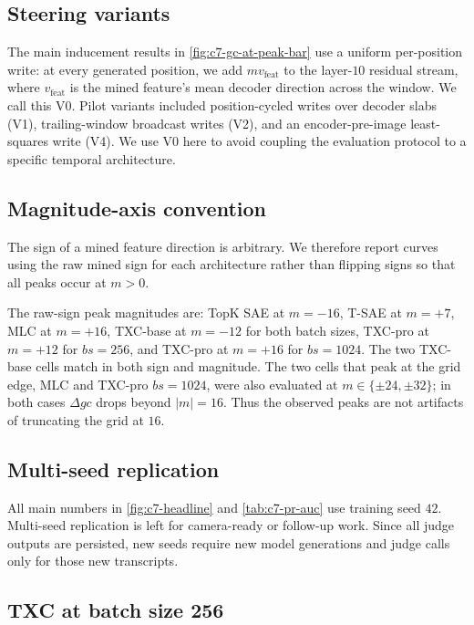 \subsection{Steering variants}
\label{app:c7-steering-variants}

The main inducement results in \cref{fig:c7-gc-at-peak-bar} use a uniform per-position write: at every generated position, we add $m v_{\text{feat}}$ to the layer-$10$ residual stream, where $v_{\text{feat}}$ is the mined feature's mean decoder direction across the window. We call this V0. Pilot variants included position-cycled writes over decoder slabs (V1), trailing-window broadcast writes (V2), and an encoder-pre-image least-squares write (V4). We use V0 here to avoid coupling the evaluation protocol to a specific temporal architecture.

\subsection{Magnitude-axis convention}
\label{app:c7-magnitude-axis}

The sign of a mined feature direction is arbitrary. We therefore report curves using the raw mined sign for each architecture rather than flipping signs so that all peaks occur at $m>0$.

The raw-sign peak magnitudes are: TopK SAE at $m=-16$, T-SAE at $m=+7$, MLC at $m=+16$, TXC-base at $m=-12$ for both batch sizes, TXC-pro at $m=+12$ for $bs=256$, and TXC-pro at $m=+16$ for $bs=1024$. The two TXC-base cells match in both sign and magnitude. The two cells that peak at the grid edge, MLC and TXC-pro $bs=1024$, were also evaluated at $m \in \{\pm24, \pm32\}$; in both cases $\Delta gc$ drops beyond $|m|=16$. Thus the observed peaks are not artifacts of truncating the grid at $16$.

\subsection{Multi-seed replication}
\label{app:c7-seeds}

All main numbers in \cref{fig:c7-headline} and \cref{tab:c7-pr-auc} use training seed $42$. Multi-seed replication is left for camera-ready or follow-up work. Since all judge outputs are persisted, new seeds require new model generations and judge calls only for those new transcripts.

\subsection{TXC at batch size 256}
\label{app:c7-bs-256}


